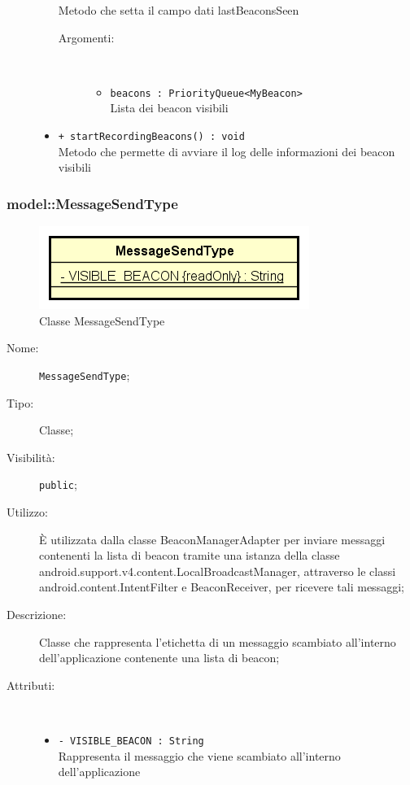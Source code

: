 \documentclass[../DefinizioneDiProdotto.tex]{subfiles}
\begin{document}
\begin{description}
\begin{itemize}
Metodo che setta il campo dati lastBeaconsSeen
 \begin{description}
\item[Argomenti:] \
\begin{itemize}
\item \texttt{beacons : PriorityQueue<MyBeacon>}\\
Lista dei beacon visibili\end{itemize}
\end{description}
\item \texttt{+ startRecordingBeacons() : void}\\
Metodo che permette di avviare il log delle informazioni dei beacon visibili
 \end{itemize}
\end{description}

\subsubsection{model::MessageSendType}

    \begin{figure}[H]
        \centering
        \includegraphics{img/MessageSendType.png}
        \caption{Classe MessageSendType}\label{fig:model::MessageSendType} 
    \end{figure}
    \begin{description}
\item[Nome:] \texttt{MessageSendType};
\item[Tipo:] Classe;
\item[Visibilità:] \texttt{public};
\item[Utilizzo:] È utilizzata dalla classe BeaconManagerAdapter per inviare messaggi contenenti la lista di beacon tramite una istanza della classe android.support.v4.content.LocalBroadcastManager, attraverso le classi android.content.IntentFilter e BeaconReceiver, per ricevere tali messaggi;
\item[Descrizione:] Classe che rappresenta l'etichetta di un messaggio scambiato all'interno dell'applicazione contenente una lista di beacon;
\item[Attributi:] \
\begin{itemize}
\item \texttt{- VISIBLE\_BEACON : String}\\
Rappresenta il messaggio che viene scambiato all'interno dell'applicazione

\end{itemize}
\end{description}
\end{document}
